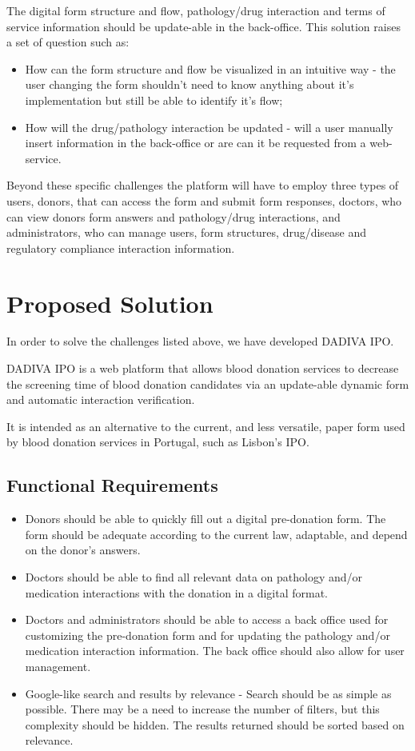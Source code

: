 The digital form structure and flow, pathology/drug interaction and terms of service information should be update-able in the back-office.
This solution raises a set of question such as:
\begin{itemize}
	\item How can the form structure and flow be visualized in an intuitive way - the user changing the form shouldn't need to know anything about it's implementation but still be able to identify it's flow;
	\item How will the drug/pathology interaction be updated - will a user manually insert information in the back-office or are can it be requested from a web-service.
\end{itemize}

Beyond these specific challenges the platform will have to employ three types of users, donors, that can access the form and submit form responses, doctors, who can view donors form answers and pathology/drug interactions, and administrators, who can manage users, form structures, drug/disease and regulatory compliance interaction information.
\section{Proposed Solution}

In order to solve the challenges listed above, we have developed DADIVA IPO.

DADIVA IPO is a web platform that allows blood donation services to decrease the screening time of blood donation candidates via an update-able dynamic form and automatic interaction verification.

It is intended as an alternative to the current, and less versatile, paper form used by blood donation services in Portugal, such as Lisbon's IPO.

\subsection{Functional Requirements}
\begin{itemize}
	\item Donors should be able to quickly fill out a digital pre-donation form. The form should be adequate according to the current law, adaptable, and depend on the donor’s answers.
	
	\item Doctors should be able to find all relevant data on pathology and/or medication interactions with the donation in a digital format.
	
	\item Doctors and administrators should be able to access a back office used for customizing the pre-donation form and for updating the pathology and/or medication interaction information. The back office should also allow for user management.
	
	\item Google-like search and results by relevance - Search should be as simple as possible. There may be a need to increase the number of filters, but this complexity should be hidden. The results returned should be sorted based on relevance.
\end{itemize}

